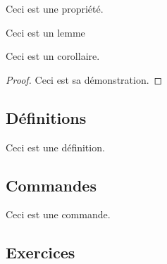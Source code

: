     \begin{latexcode}
        \begin{property}{}{}
            Ceci est une propriété.
        \end{property}
    \end{latexcode}

    \begin{latexcode}
        \begin{lemma}{}{}
            Ceci est un lemme
        \end{lemma}
    \end{latexcode}

    \begin{latexcode}
        \begin{corollary}{}{}
            Ceci est un corollaire.
        \end{corollary}
    \end{latexcode}

    \begin{latexcode}
        \begin{proof}
            Ceci est sa démonstration.
        \end{proof}
    \end{latexcode}

    \subsection{Définitions}

    \begin{latexcode}
        \begin{definition}{}{}
            Ceci est une définition.
        \end{definition}
    \end{latexcode}
    \subsection{Commandes}

    \begin{latexcode}
        \begin{command}{}{}
            Ceci est une commande.
        \end{command}
    \end{latexcode}

    \subsection{Exercices}


